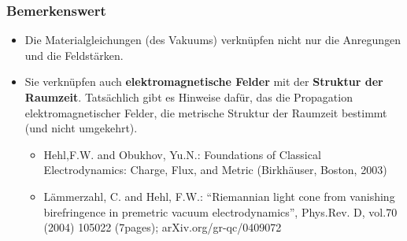 \begin{frame}
  \frametitle{Bemerkenswert}
\begin{itemize}[<+->]
\item Die Materialgleichungen (des Vakuums) verknüpfen nicht nur die Anregungen und die Feldstärken.
\item  Sie verknüpfen auch \textbf{elektromagnetische Felder} mit der \textbf{Struktur der Raumzeit}.
Tatsächlich gibt es Hinweise dafür, das die Propagation elektromagnetischer Felder, die metrische Struktur der Raumzeit bestimmt (und nicht umgekehrt).
\begin{itemize}
\item Hehl,F.W. and Obukhov, Yu.N.: Foundations of Classical Electrodynamics: Charge, Flux, and Metric (Birkhäuser, Boston, 2003)
\item Lämmerzahl, C. and Hehl, F.W.: \enquote{Riemannian light cone from vanishing birefringence in premetric vacuum electrodynamics}, Phys.Rev. D, vol.70 (2004) 105022 (7pages); arXiv.org/gr-qc/0409072
\end{itemize}
\end{itemize}
\end{frame}

 
